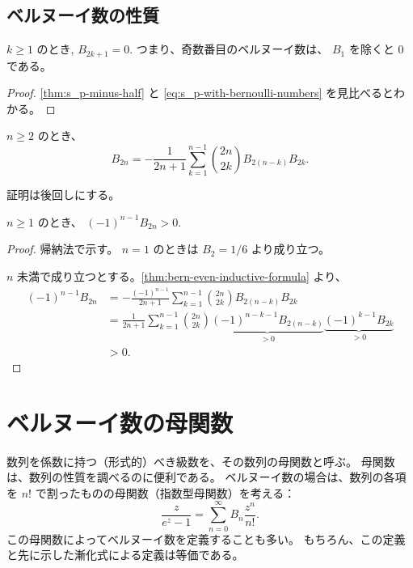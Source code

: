{\subsection{ベルヌーイ数の性質}

\begin{theorem} \label{thm:bern-odd}
  $k\ge 1$ のとき, $B_{2k+1}=0$.
  つまり、奇数番目のベルヌーイ数は、 $B_1$ を除くと $0$ である。
\end{theorem}
\begin{proof}
  \autoref{thm:s_p-minus-half} と \autoref{eq:s_p-with-bernoulli-numbers} を見比べるとわかる。
\end{proof}


\begin{theorem} \label{thm:bern-even-inductive-formula}
  $n\ge 2$ のとき、
  \[
    B_{2n}=-\frac{1}{2n+1}\sum_{k=1}^{n-1}\binom{2n}{2k}B_{2(n-k)}B_{2k}.
  \]
\end{theorem}
証明は後回しにする。

\begin{corollary}
  $n\ge 1$ のとき、 $(-1)^{n-1}B_{2n}>0$.
\end{corollary}
\begin{proof}
  帰納法で示す。
  $n=1$ のときは $B_2=1/6$ より成り立つ。

  $n$ 未満で成り立つとする。\autoref{thm:bern-even-inductive-formula} より、
  \begin{align*}
    (-1)^{n-1} B_{2n}
    &=-\frac{(-1)^{n-1}}{2n+1}\sum_{k=1}^{n-1}\binom{2n}{2k}B_{2(n-k)}B_{2k} \\
    &=\frac{1}{2n+1}\sum_{k=1}^{n-1}\binom{2n}{2k}
      \underbrace{(-1)^{n-k-1}B_{2(n-k)}}_{>0}
      \underbrace{(-1)^{k-1}B_{2k}}_{>0} \\
    &>0.
  \end{align*}
\end{proof}

\section{ベルヌーイ数の母関数}
数列を係数に持つ（形式的）べき級数を、その数列の母関数と呼ぶ。
母関数は、数列の性質を調べるのに便利である。
ベルヌーイ数の場合は、数列の各項を $n!$ で割ったものの母関数（指数型母関数）を考える：
\begin{equation} \label{eq:exponential-generating-function}
  \frac{z}{e^z-1}=\sum_{n=0}^\infty B_n\frac{z^n}{n!}.
\end{equation}
この母関数によってベルヌーイ数を定義することも多い。
もちろん、この定義と先に示した漸化式による定義は等価である。

}
